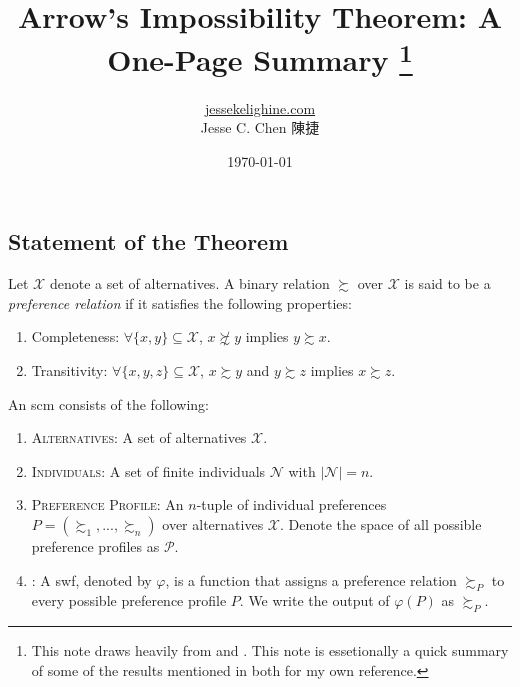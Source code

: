 \documentclass[a4paper]{article}
\title{Arrow's Impossibility Theorem: A One-Page Summary%
\thanks{This note draws heavily from \textcite{maskin-sen-2014} \citetitle{maskin-sen-2014} and
\textcite{rubinstein-2006} \citetitle{rubinstein-2006}. This note is essetionally a quick summary
of some of the results mentioned in both for my own reference.}%
}
\author{\href{https://jessekelighine.com}{jessekelighine.com}\\Jesse C. Chen 陳捷}
\date{\today}
\begin{document}
\maketitle

\begin{multicols}{2}

\section{Statement of the Theorem}

\begin{definition}
	Let $\mathcal{X}$ denote a set of alternatives.
	A binary relation $\succsim$ over $\mathcal{X}$ is said to be a \emph{preference relation}
	if it satisfies the following properties:
	\begin{enumerate}
		\item Completeness:
			$\forall \{x,y\}\subseteq\mathcal{X}$, $x\not\succsim y$ implies $y\succsim x$.
		\item Transitivity:
			$\forall \{x,y,z\}\subseteq\mathcal{X}$, $x\succsim y$ and $y\succsim z$ implies $x\succsim z$.
	\end{enumerate}
\end{definition}

\begin{definition}
	An \gls*{scm} consists of the following:
	\begin{enumerate}
		\item \textsc{Alternatives}:
			A set of alternatives $\mathcal{X}$.
		\item \textsc{Individuals}:
			A set of finite individuals $\mathcal{N}$ with $|\mathcal{N}|=n$.
		\item \textsc{Preference Profile}:
			An $n$-tuple of individual preferences $P=(\succsim_1,...,\succsim_n)$ over alternatives $\mathcal{X}$.
			Denote the space of all possible preference profiles as $\mathcal{P}$.
		\item \textsc{}:
			A \gls*{swf}, denoted by $\varphi$,
			is a function that assigns a preference relation $\succsim_P$ to every possible preference profile $P$.
			We write the output of $\varphi(P)$ as $\succsim_{P}$.
	\end{enumerate}
\end{definition}


\end{multicols}
\end{document}
